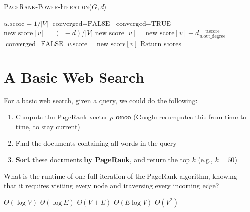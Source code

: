 \documentclass[11pt]{exam}
\begin{document}
\begin{algorithm}
    \textsc{PageRank-Power-Iteration}($G,d$)
    \begin{algorithmic}
        \State $u.\text{score} = 1 / |V|$
        \EndFor
        \State $\text{converged} = \text{FALSE}$ 
        \State $\text{converged} = \text{TRUE}$
        \State $\text{new\_score}[v] = (1-d) / |V|$
        \State $\text{new\_score}[v] = \text{new\_score}[v] + d \frac{u.\text{score}}{u.\text{out\_degree}}$
        \EndFor
        \State $\text{converged} = \text{FALSE}$
        \EndIf
        \EndFor
        \State $v.\text{score} = \text{new\_score}[v]$
        \EndFor
        \EndWhile
        \State Return scores
    \end{algorithmic}
\end{algorithm}

\begin{center}
\end{center}

\newpage
\section{A Basic Web Search}
For a basic web search, given a query, we could do the following:
\begin{enumerate}
    \item Compute the PageRank vector $p$ \textbf{once} (Google recomputes this from time to time, to stay current)
    \item Find the documents containing all words in the query
    \item \textbf{Sort} these documents \textbf{by PageRank}, and return the top $k$ (e.g., $k=50$)
\end{enumerate}

\vspace{1cm}

\begin{Qu}
    What is the runtime of one full iteration of the PageRank algorithm, knowing that it requires visiting every node and traversing every incoming edge?
    \begin{itemize}
        \aitem $\Theta(\log V)$
        \bitem $\Theta(\log E)$
        \citem $\Theta(V + E)$
        \ditem $\Theta(E \log V)$
        \eitem $\Theta(V^2)$
    \end{itemize}
\end{Qu}
\end{document}
